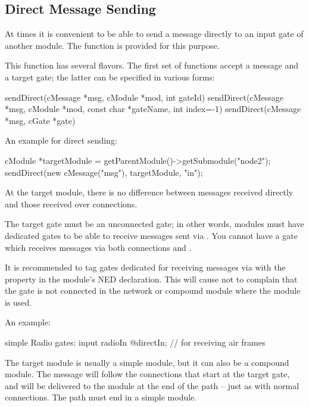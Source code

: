 \begin{ned}
\subsection{Direct Message Sending}
\label{sec:simple-modules:direct-sending}

At times it is convenient to be able to send a message directly to an input
gate of another module. The  function is provided for
this purpose.

This function has several flavors. The first set of 
functions accept a message and a target gate; the latter can be specified
in various forms:

\begin{cpp}
sendDirect(cMessage *msg, cModule *mod, int gateId)
sendDirect(cMessage *msg, cModule *mod, const char *gateName, int index=-1)
sendDirect(cMessage *msg, cGate *gate)
\end{cpp}

An example for direct sending:

\begin{cpp}
cModule *targetModule = getParentModule()->getSubmodule("node2");
sendDirect(new cMessage("msg"), targetModule, "in");
\end{cpp}

At the target module, there is no difference between messages received
directly and those received over connections.

The target gate must be an unconnected gate; in other words,
modules must have dedicated gates to be able to receive messages
sent via . You cannot have a gate which receives
messages via both connections and .

It is recommended to tag gates dedicated for receiving messages via
 with the  property in the module's NED
declaration. This will cause {\opp} not to complain that the gate is not
connected in the network or compound module where the module is used.

An example:

\begin{ned}
simple Radio {
    gates:
        input radioIn @directIn; // for receiving air frames
}
\end{ned}

The target module is usually a simple module, but it can also be a compound
module. The message will follow the connections that start at the target
gate, and will be delivered to the module at the end of the path -- just as
with normal connections. The path must end in a simple module.


\end{ned}

